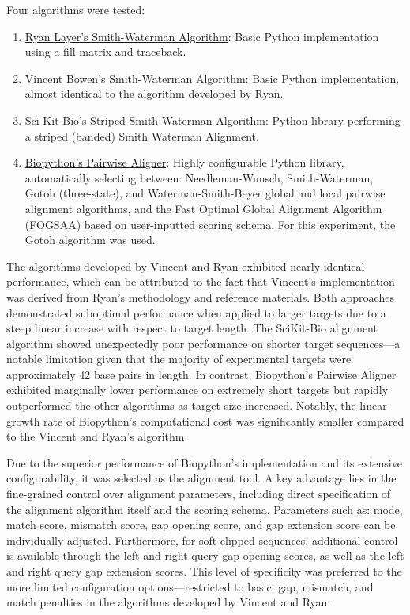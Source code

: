 \documentclass[11pt, letterpaper]{article}
\begin{document}
Four algorithms were tested:
\begin{enumerate}
    \item \href{https://github.com/ryanlayerlab/sequence_alignment/tree/main}{Ryan Layer's Smith-Waterman Algorithm}: Basic Python implementation using a fill matrix and traceback. 
    \item Vincent Bowen's Smith-Waterman Algorithm: Basic Python implementation, almost identical to the algorithm developed by Ryan.
    \item \href{https://scikit.bio/docs/dev/generated/skbio.alignment.StripedSmithWaterman.html}{Sci-Kit Bio's Striped Smith-Waterman Algorithm}: Python library performing a striped (banded) Smith Waterman Alignment.
    \item \href{https://biopython.org/docs/dev/Tutorial/chapter_pairwise.html}{Biopython's Pairwise Aligner}: Highly configurable Python library, automatically selecting between: Needleman-Wunsch, Smith-Waterman, Gotoh (three-state), and Waterman-Smith-Beyer global and local pairwise alignment algorithms, and the Fast Optimal Global Alignment Algorithm (FOGSAA) based on user-inputted scoring schema. For this experiment, the Gotoh algorithm was used.
\end{enumerate}

The algorithms developed by Vincent and Ryan exhibited nearly identical performance, which can be attributed to the fact that Vincent's implementation was derived from Ryan's methodology and reference materials. Both approaches demonstrated suboptimal performance when applied to larger targets due to a steep linear increase with respect to target length. The SciKit-Bio alignment algorithm showed unexpectedly poor performance on shorter target sequences—a notable limitation given that the majority of experimental targets were approximately 42 base pairs in length. In contrast, Biopython’s Pairwise Aligner exhibited marginally lower performance on extremely short targets but rapidly outperformed the other algorithms as target size increased. Notably, the linear growth rate of Biopython’s computational cost was significantly smaller compared to the Vincent and Ryan's algorithm.

Due to the superior performance of Biopython's implementation and its extensive configurability, it was selected as the alignment tool. A key advantage lies in the fine-grained control over alignment parameters, including direct specification of the alignment algorithm itself and the scoring schema. Parameters such as: mode, match score, mismatch score, gap opening score, and gap extension score can be individually adjusted. Furthermore, for soft-clipped sequences, additional control is available through the left and right query gap opening scores, as well as the left and right query gap extension scores. This level of specificity was preferred to the more limited configuration options—restricted to basic: gap, mismatch, and match penalties in the algorithms developed by Vincent and Ryan.
\end{document}
